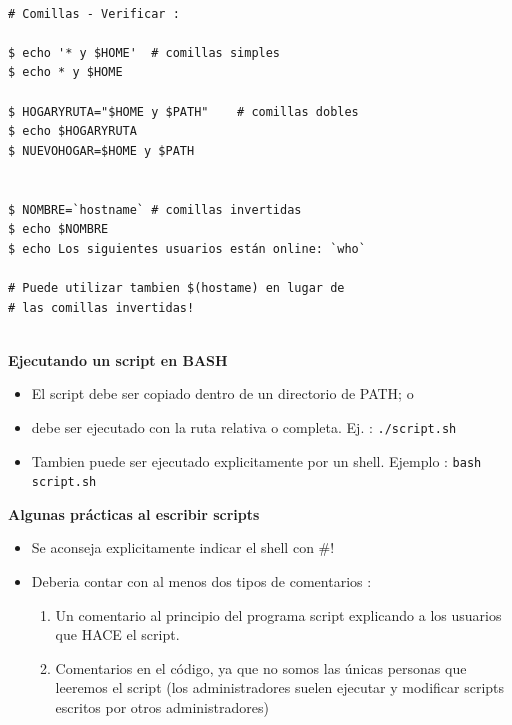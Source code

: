 \documentclass{beamer}
\begin{document}
\begin{Verbatim}

# Comillas - Verificar : 

$ echo '* y $HOME'	# comillas simples
$ echo * y $HOME

$ HOGARYRUTA="$HOME y $PATH"	# comillas dobles
$ echo $HOGARYRUTA
$ NUEVOHOGAR=$HOME y $PATH


$ NOMBRE=`hostname`	# comillas invertidas
$ echo $NOMBRE
$ echo Los siguientes usuarios están online: `who` 

# Puede utilizar tambien $(hostame) en lugar de
# las comillas invertidas!


\end{Verbatim}


\begin{frame}{}
\textbf{Ejecutando un script en BASH }
\begin{itemize}
\item El script debe ser copiado dentro de un directorio de PATH; o
\item debe ser ejecutado con la ruta relativa o completa. Ej. : \texttt{./script.sh}
\item Tambien puede ser ejecutado explicitamente por un shell. Ejemplo : \texttt{bash script.sh}
\end{itemize}

\end{frame}

\begin{frame}{}
\textbf{Algunas prácticas al escribir scripts }
\begin{itemize}
\item Se aconseja explicitamente indicar el shell con \#!
\item Deberia contar con al menos dos tipos de comentarios :
\begin{enumerate}
\item Un comentario al principio del programa script explicando a los usuarios que HACE el script.
\item Comentarios en el código, ya que no somos las únicas personas que leeremos el script 
(los administradores suelen ejecutar y modificar scripts escritos por otros administradores)
\end{enumerate}
\end{itemize}

\end{frame}
\end{document}
